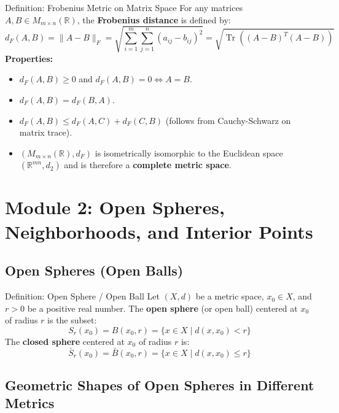 \documentclass[11pt,a4paper]{article}
\begin{document}
\begin{defbox}{Definition: Frobenius Metric on Matrix Space}
For any matrices $A, B \in M_{m \times n}(\mathbb{R})$, the \textbf{Frobenius distance} is defined by:
\begin{equation}
    d_F(A, B) = \|A - B\|_F = \sqrt{\sum_{i=1}^m \sum_{j=1}^n (a_{ij} - b_{ij})^2} = \sqrt{\operatorname{Tr}\left((A-B)^T(A-B)\right)}
\end{equation}
\textbf{Properties:}
\begin{itemize}
    \item $d_F(A, B) \ge 0$ and $d_F(A, B) = 0 \iff A = B$.
    \item $d_F(A, B) = d_F(B, A)$.
    \item $d_F(A, B) \le d_F(A, C) + d_F(C, B)$ (follows from Cauchy-Schwarz on matrix trace).
    \item $(M_{m \times n}(\mathbb{R}), d_F)$ is isometrically isomorphic to the Euclidean space $(\mathbb{R}^{mn}, d_2)$ and is therefore a \textbf{complete metric space}.
\end{itemize}
\end{defbox}

\newpage

\section{Module 2: Open Spheres, Neighborhoods, and Interior Points}

\subsection{Open Spheres (Open Balls)}

\begin{defbox}{Definition: Open Sphere / Open Ball}
Let $(X, d)$ be a metric space, $x_0 \in X$, and $r > 0$ be a positive real number. The \textbf{open sphere} (or open ball) centered at $x_0$ of radius $r$ is the subset:
\begin{equation}
    S_r(x_0) = B(x_0, r) = \{ x \in X \mid d(x, x_0) < r \}
\end{equation}
The \textbf{closed sphere} centered at $x_0$ of radius $r$ is:
\begin{equation}
    \bar{S}_r(x_0) = \bar{B}(x_0, r) = \{ x \in X \mid d(x, x_0) \le r \}
\end{equation}
\end{defbox}

\subsection{Geometric Shapes of Open Spheres in Different Metrics}
\end{document}
